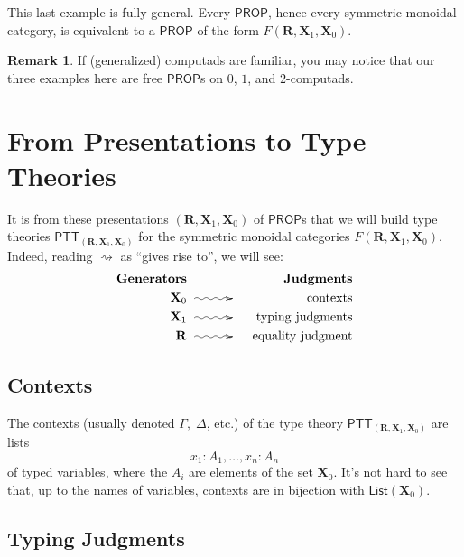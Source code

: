 \documentclass[pra,floatfix,
amsmath,superscriptaddress, 12pt]{article}
\theoremstyle{definition}
\newtheorem*{remark}{Remark}
\begin{document}
This last example is fully general. Every $\mathsf{PROP}$, hence every symmetric monoidal category, is equivalent to a $\mathsf{PROP}$ of the form $F(\mathbf{R},\mathbf{X}_1,\mathbf{X}_0)$.

\begin{remark} If (generalized) computads are familiar, you may notice that our three examples here are free $\mathsf{PROP}$s on $0$, $1$, and $2$-computads.
\end{remark}

\section{From Presentations to Type Theories}

It is from these presentations $(\mathbf{R},\mathbf{X}_1,\mathbf{X}_0)$ of $\mathsf{PROP}$s that we will build type theories $\mathsf{PTT}_{(\mathbf{R},\mathbf{X}_1,\mathbf{X}_0)}$ for the symmetric monoidal categories $F(\mathbf{R},\mathbf{X}_1,\mathbf{X}_0)$. Indeed, reading $\rightsquigarrow$ as ``gives rise to'', we will see:
    \begin{eqnarray*}
      \mathbf{Generators}
        &
            &
            \mathbf{Judgments}
                \\
      \mathbf{X}_0
        & \xymatrix@C=3em{{}\ar@{~>}[r]&{}}
            & \mathrm{contexts} \\
      \mathbf{X}_1 & \xymatrix@C=3em{{}\ar@{~>}[r]&{}} & \mathrm{typing \ judgments} \\
      \mathbf{R}   & \xymatrix@C=3em{{}\ar@{~>}[r]&{}} & \mathrm{equality \ judgment}
    \end{eqnarray*}

\subsection{Contexts}

The contexts (usually denoted $\Gamma,\;\Delta$, etc.) of the type theory $\mathsf{PTT}_{(\mathbf{R},\mathbf{X}_1,\mathbf{X}_0)}$  are lists
    \[
        x_{1}:A_{1},\dots,x_{n}:A_{n}
    \]
of typed variables, where the $A_i$ are elements of the set $\mathbf{X}_{0}$. It's not hard to see that, up to the names of variables, contexts are in bijection with $\mathsf{List}(\mathbf{X}_0)$.

\subsection{Typing Judgments}
\end{document}
